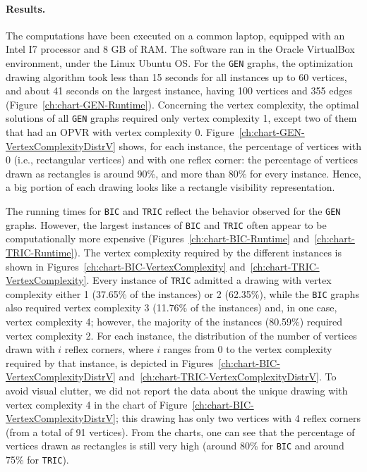 \documentclass{article}
\newcommand{\opvr}{OPVR\xspace}
\begin{document}
 
\paragraph{Results.}
The computations have been executed on a common laptop, equipped with an Intel I7 processor and 8 GB of RAM. The software ran in the Oracle VirtualBox environment, under the Linux Ubuntu OS. For the {\tt GEN} graphs, the optimization drawing algorithm took less than 15 seconds for all instances up to 60 vertices, and about 41 seconds on the largest instance, having 100 vertices and 355 edges (Figure~\ref{ch:chart-GEN-Runtime}). Concerning the vertex complexity, the optimal solutions of all {\tt GEN} graphs required only vertex complexity 1, except two of them that had an \opvr with vertex complexity 0. Figure~\ref{ch:chart-GEN-VertexComplexityDistrV} shows, for each instance, the percentage of vertices with 0 (i.e., rectangular vertices) and with one reflex corner: the percentage of vertices drawn as rectangles is around 90\%, and more than 80\% for every instance. Hence, a big portion of each drawing looks like a rectangle visibility representation. 


The running times for {\tt BIC} and {\tt TRIC} reflect the behavior observed for the {\tt GEN} graphs. However, the largest instances of {\tt BIC} and {\tt TRIC} often appear to be computationally more expensive (Figures~\ref{ch:chart-BIC-Runtime} and~\ref{ch:chart-TRIC-Runtime}). The vertex complexity required by the different instances is shown in Figures~\ref{ch:chart-BIC-VertexComplexity} and~\ref{ch:chart-TRIC-VertexComplexity}. Every instance of {\tt TRIC} admitted a drawing with vertex complexity either 1 (37.65\% of the instances) or 2 (62.35\%), while the {\tt BIC} graphs also required vertex complexity 3 (11.76\% of the instances) and, in one case, vertex complexity 4; however, the majority of the instances (80.59\%) required vertex complexity 2.
For each instance, the distribution of the number of vertices drawn with $i$ reflex corners, where $i$ ranges from 0 to the vertex complexity required by that instance, is depicted in Figures~\ref{ch:chart-BIC-VertexComplexityDistrV} and~\ref{ch:chart-TRIC-VertexComplexityDistrV}. To avoid visual clutter,  we did not report the data about the unique drawing with vertex complexity 4 in the chart of Figure~\ref{ch:chart-BIC-VertexComplexityDistrV}; this drawing has only two vertices with 4 reflex corners (from a total of 91 vertices). From the charts, one can see that the percentage of vertices drawn as rectangles is still very high (around 80\% for {\tt BIC} and around 75\% for {\tt TRIC}). 
\end{document}
